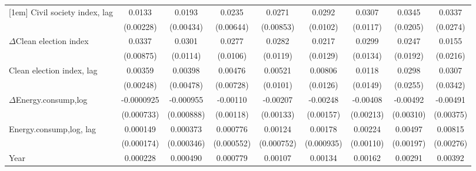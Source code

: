 \begin{table}[htbp]
\begin{tabular}{l*{8}{c}}
[1em]
Civil society index, lag      &      0.0133\sym{***}&      0.0193\sym{***}&      0.0235\sym{***}&      0.0271\sym{***}&      0.0292\sym{***}&      0.0307\sym{***}&      0.0345\sym{*}  &      0.0337         \\
                    &   (0.00228)         &   (0.00434)         &   (0.00644)         &   (0.00853)         &    (0.0102)         &    (0.0117)         &    (0.0205)         &    (0.0274)         \\
[1em]
$\Delta$Clean election index      &      0.0337\sym{***}&      0.0301\sym{***}&      0.0277\sym{***}&      0.0282\sym{**} &      0.0217\sym{*}  &      0.0299\sym{**} &      0.0247         &      0.0155         \\
                    &   (0.00875)         &    (0.0114)         &    (0.0106)         &    (0.0119)         &    (0.0129)         &    (0.0134)         &    (0.0192)         &    (0.0216)         \\
[1em]
Clean election index, lag        &     0.00359         &     0.00398         &     0.00476         &     0.00521         &     0.00806         &      0.0118         &      0.0298         &      0.0307         \\
                    &   (0.00248)         &   (0.00478)         &   (0.00728)         &    (0.0101)         &    (0.0126)         &    (0.0149)         &    (0.0255)         &    (0.0342)         \\
[1em]
$\Delta$Energy.consump,log             &  -0.0000925         &   -0.000955         &    -0.00110         &    -0.00207         &    -0.00248         &    -0.00408\sym{*}  &    -0.00492         &    -0.00491         \\
                    &  (0.000733)         &  (0.000888)         &   (0.00118)         &   (0.00133)         &   (0.00157)         &   (0.00213)         &   (0.00310)         &   (0.00375)         \\
[1em]
Energy.consump,log, lag             &    0.000149         &    0.000373         &    0.000776         &     0.00124         &     0.00178\sym{*}  &     0.00224\sym{**} &     0.00497\sym{**} &     0.00815\sym{***}\\
                    &  (0.000174)         &  (0.000346)         &  (0.000552)         &  (0.000752)         &  (0.000935)         &   (0.00110)         &   (0.00197)         &   (0.00276)         \\
[1em]
Year                &    0.000228\sym{***}&    0.000490\sym{***}&    0.000779\sym{***}&     0.00107\sym{***}&     0.00134\sym{***}&     0.00162\sym{***}&     0.00291\sym{***}&     0.00392\sym{***}\\

\end{tabular}
\end{table}
